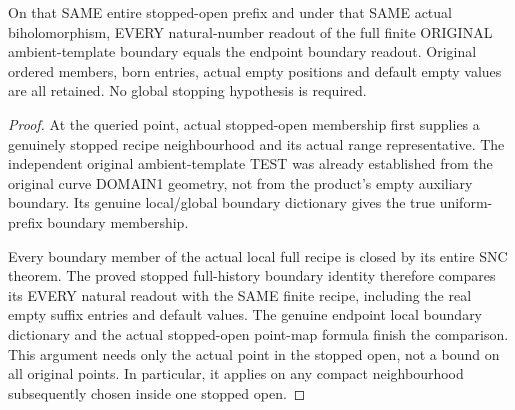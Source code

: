 \begin{theorem}
\label{hir:sharp-actual-curve-growing-stopped-open-boundary}
\leanok
On that SAME entire stopped-open prefix and under that SAME actual
biholomorphism, EVERY natural-number readout of the full finite ORIGINAL
ambient-template boundary equals the endpoint boundary readout. Original
ordered members, born entries, actual empty positions and default empty
values are all retained. No global stopping hypothesis is required.
\end{theorem}
\begin{proof}
At the queried point, actual stopped-open membership first supplies a
genuinely stopped recipe neighbourhood and its actual range representative.
The independent original ambient-template TEST was already established
from the original curve DOMAIN1 geometry, not from the product's empty
auxiliary boundary. Its genuine local/global boundary dictionary gives
the true uniform-prefix boundary membership.

Every boundary member of the actual local full recipe is closed by its
entire SNC theorem. The proved stopped full-history boundary identity
therefore compares its EVERY natural readout with the SAME finite recipe,
including the real empty suffix entries and default values. The genuine
endpoint local boundary dictionary and the actual stopped-open point-map
formula finish the comparison. This argument needs only the actual point
in the stopped open, not a bound on all original points. In particular,
it applies on any compact neighbourhood subsequently chosen inside one
stopped open.
\end{proof}

